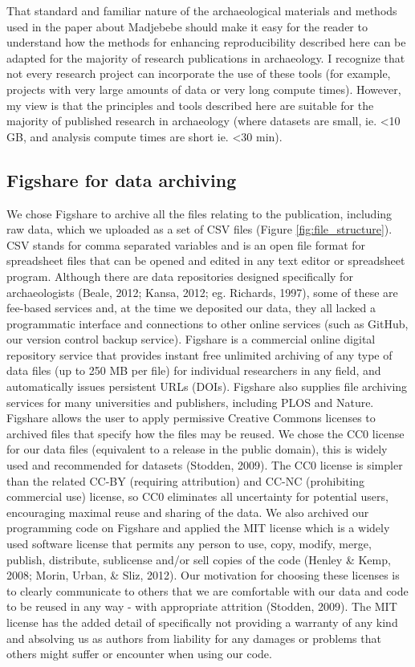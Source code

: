 \documentclass[american,man]{apa6}
\newcounter{author}
\begin{document}
That standard and familiar nature of the archaeological materials and
methods used in the paper about Madjebebe should make it easy for the
reader to understand how the methods for enhancing reproducibility
described here can be adapted for the majority of research publications
in archaeology. I recognize that not every research project can
incorporate the use of these tools (for example, projects with very
large amounts of data or very long compute times). However, my view is
that the principles and tools described here are suitable for the
majority of published research in archaeology (where datasets are small,
ie. \textless{}10 GB, and analysis compute times are short ie.
\textless{}30 min).

\subsection{Figshare for data
archiving}\label{figshare-for-data-archiving}

We chose Figshare to archive all the files relating to the publication,
including raw data, which we uploaded as a set of CSV files (Figure
\ref{fig:file_structure}). CSV stands for comma separated variables and
is an open file format for spreadsheet files that can be opened and
edited in any text editor or spreadsheet program. Although there are
data repositories designed specifically for archaeologists (Beale, 2012;
Kansa, 2012; eg. Richards, 1997), some of these are fee-based services
and, at the time we deposited our data, they all lacked a programmatic
interface and connections to other online services (such as GitHub, our
version control backup service). Figshare is a commercial online digital
repository service that provides instant free unlimited archiving of any
type of data files (up to 250 MB per file) for individual researchers in
any field, and automatically issues persistent URLs (DOIs). Figshare
also supplies file archiving services for many universities and
publishers, including PLOS and Nature. Figshare allows the user to apply
permissive Creative Commons licenses to archived files that specify how
the files may be reused. We chose the CC0 license for our data files
(equivalent to a release in the public domain), this is widely used and
recommended for datasets (Stodden, 2009). The CC0 license is simpler
than the related CC-BY (requiring attribution) and CC-NC (prohibiting
commercial use) license, so CC0 eliminates all uncertainty for potential
users, encouraging maximal reuse and sharing of the data. We also
archived our programming code on Figshare and applied the MIT license
which is a widely used software license that permits any person to use,
copy, modify, merge, publish, distribute, sublicense and/or sell copies
of the code (Henley \& Kemp, 2008; Morin, Urban, \& Sliz, 2012). Our
motivation for choosing these licenses is to clearly communicate to
others that we are comfortable with our data and code to be reused in
any way - with appropriate attrition (Stodden, 2009). The MIT license
has the added detail of specifically not providing a warranty of any
kind and absolving us as authors from liability for any damages or
problems that others might suffer or encounter when using our code.
\end{document}
